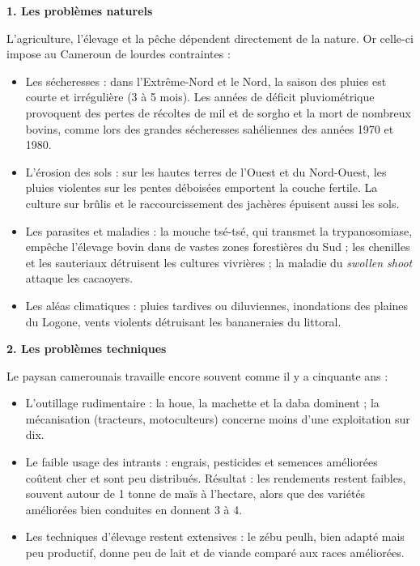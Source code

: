 \documentclass[11pt]{article}
\newcommand{\cle}[1]{{\popxbold\color{popdark}#1}}
\begin{document}
\textbf{1. Les problèmes naturels}\par

L'agriculture, l'élevage et la pêche dépendent directement de la nature. Or celle-ci impose au Cameroun de lourdes contraintes :

\begin{itemize}
\item Les \cle{sécheresses} : dans l'Extrême-Nord et le Nord, la saison des pluies est courte et irrégulière (3 à 5 mois). Les années de déficit pluviométrique provoquent des pertes de récoltes de mil et de sorgho et la mort de nombreux bovins, comme lors des grandes sécheresses sahéliennes des années 1970 et 1980.
\item L'\cle{érosion des sols} : sur les hautes terres de l'Ouest et du Nord-Ouest, les pluies violentes sur les pentes déboisées emportent la couche fertile. La culture sur brûlis et le raccourcissement des jachères épuisent aussi les sols.
\item Les \cle{parasites et maladies} : la mouche \cle{tsé-tsé}, qui transmet la trypanosomiase, empêche l'élevage bovin dans de vastes zones forestières du Sud ; les chenilles et les sauteriaux détruisent les cultures vivrières ; la maladie du \emph{swollen shoot} attaque les cacaoyers.
\item Les \cle{aléas climatiques} : pluies tardives ou diluviennes, inondations des plaines du Logone, vents violents détruisant les bananeraies du littoral.
\end{itemize}

\textbf{2. Les problèmes techniques}\par

Le paysan camerounais travaille encore souvent comme il y a cinquante ans :

\begin{itemize}
\item L'\cle{outillage rudimentaire} : la houe, la machette et la daba dominent ; la \cle{mécanisation} (tracteurs, motoculteurs) concerne moins d'une exploitation sur dix.
\item Le faible usage des \cle{intrants} : engrais, pesticides et semences améliorées coûtent cher et sont peu distribués. Résultat : les rendements restent faibles, souvent autour de 1 tonne de maïs à l'hectare, alors que des variétés améliorées bien conduites en donnent 3 à 4.
\item Les techniques d'élevage restent extensives : le zébu peulh, bien adapté mais peu productif, donne peu de lait et de viande comparé aux races améliorées.
\end{itemize}
\end{document}
